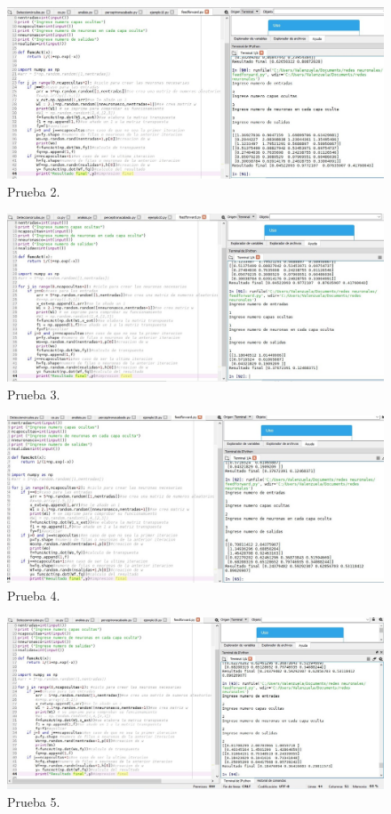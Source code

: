 \documentclass[10pt,a4paper]{article}
\begin{document}
\begin{figure}[H]
\includegraphics[scale=0.4] {p2.jpg}
\caption{Prueba 2.}
\label{fig:p2}
\end{figure}
\begin{figure}[H]
\includegraphics[scale=0.4] {p3.jpg}
\caption{Prueba 3.}
\label{fig:p3}
\end{figure}
\begin{figure}[H]
\includegraphics[scale=0.4] {p4.jpg}
\caption{Prueba 4.}
\label{fig:p4}
\end{figure}
\begin{figure}[H]
\includegraphics[scale=0.4] {p5.jpg}
\caption{Prueba 5.}
\label{fig:p5}
\end{figure}
\end{document}

